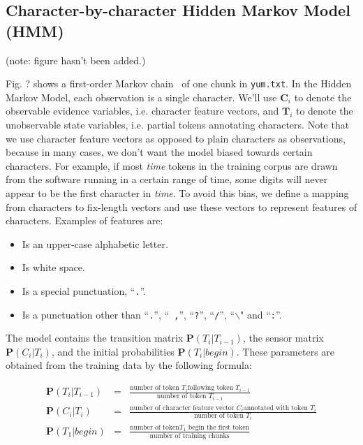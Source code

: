\subsection{Character-by-character Hidden Markov Model (HMM)}\label{subsec:hmm}

(note: figure hasn't been added.)

Fig. ? shows a first-order Markov chain~\cite{rabiner89:hmm} of one
chunk in {\tt yum.txt}. In the Hidden Markov Model, each observation
is a single character. We'll use $\mathbf{C}_i$ to denote the
observable evidence variables, i.e. character feature vectors, and
$\mathbf{T}_i$ to denote the unobservable state variables, i.e.
partial tokens annotating characters. Note that we use character
feature vectors as opposed to plain characters as observations,
because in many cases, we don't want the model biased towards
certain characters. For example, if most {\em time} tokens in the
training corpus are drawn from the software running in a certain
range of time, some digits will never appear to be the first
character in {\em time}. To avoid this bias, we define a mapping
from characters to fix-length vectors and use these vectors to
represent features of characters. Examples of features are:

\begin{itemize}
\item Is an upper-case alphabetic letter.
\item Is white space.
\item Is a special punctuation, ``{\tt .}''.
\item Is a punctuation other than ``{\tt .}'', ``{\tt
,}'', ``{\tt ?}'', ``{\tt /}'', ``{\tt $\backslash$}" and ``{\tt :}''.
\end{itemize}

The model contains the transition matrix $\mathbf{P}(T_i|T_{i-1})$,
the sensor matrix $\mathbf{P}(C_i|T_i)$, and the initial
probabilities $\mathbf{P}(T_i|begin)$. These parameters are obtained
from the training data by the following formula:

\begin{eqnarray}
\mathbf{P}(T_i|T_{i-1}) & = & \frac{\textrm{number of token }T_i\textrm{
following token }T_{i-1}}{\textrm{number of token }T_{i-1}} \label{eqn:1}\\
\mathbf{P}(C_i|T_i) & = & \frac{\textrm{number of character feature
vector }C_i\textrm{
annotated with token }T_i}{\textrm{number of token }T_i} \\
\mathbf{P}(T_1|begin) & = & \frac{\textrm{number of token
}T_1\textrm{ begin the first token}}{\textrm{number of training
chunks}} \label{eqn:2}
\end{eqnarray}

